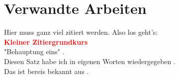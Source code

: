 \chapter{Verwandte Arbeiten}
\label{ch:relatedwork} %

\par
Hier muss ganz viel zitiert werden. Also los geht's:\\
\textbf{\textcolor{red}{Kleiner Zitiergrundkurs}}\\


"Behauptung eins" \cite[Abs. 3]{Manning2009} .\\
Diesen Satz habe ich in eigenen Worten wiedergegeben \cite{Breiman2001}.\\
Das ist bereis bekannt aus \cite[S.155-161]{Schultz1968}.




